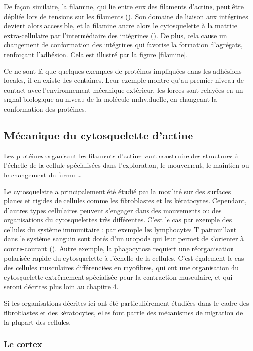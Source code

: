 \documentclass{report}
\begin{document}
De façon similaire, la filamine, qui lie entre eux des filaments d'actine, peut être dépliée lors de tensions sur les filaments  (\cite{furuike_mechanical_2001}). Son domaine de liaison aux intégrines devient alors accessible, et la filamine ancre alors le cytosquelette à la matrice extra-cellulaire par l'intermédiaire des intégrines (\cite{yamazaki_section:_2002}). De plus, cela cause un changement de conformation des intégrines qui favorise la formation d'agrégats, renforçant l'adhésion. Cela est illustré par la figure \ref{filamine}.

Ce ne sont là que quelques exemples de protéines impliquées dans les adhésions focales, il en existe des centaines. Leur exemple montre qu'au premier niveau de contact avec l'environnement mécanique extérieur, les forces sont relayées en un signal biologique au niveau de la molécule individuelle, en changeant la conformation des protéines. 

\subsection{Mécanique du cytosquelette d'actine}

Les protéines organisant les filaments d'actine vont construire des structures à l'échelle de la cellule spécialisées dans l'exploration, le mouvement, le maintien ou le changement de forme \dots

Le cytosquelette  a principalement été étudié par la motilité sur des surfaces planes et rigides de cellules comme les fibroblastes et les kératocytes. 
Cependant, d'autres types cellulaires peuvent s'engager dans des mouvements ou des organisations du cytosquelettes très différentes. 
C'est le cas par exemple des cellules du système immunitaire : par exemple les lymphocytes T patrouillant dans le système sanguin sont dotés d'un uropode qui leur permet de s'orienter à contre-courant (\cite{valignat_lymphocytes_2014}). Autre exemple, la phagocytose requiert une réorganisation polarisée rapide du cytosquelette à l'échelle de la cellules.
C'est également le cas des cellules musculaires différenciées en myofibres, qui ont une organisation du cytosquelette extrêmement spécialisée pour la contraction musculaire, et qui seront décrites plus loin au chapitre 4. 

Si les organisations décrites ici ont été particulièrement étudiées dans le cadre des fibroblastes et des kératocytes, elles font partie des mécanismes de migration de la plupart des cellules. 

\subsubsection{Le cortex}
\end{document}
